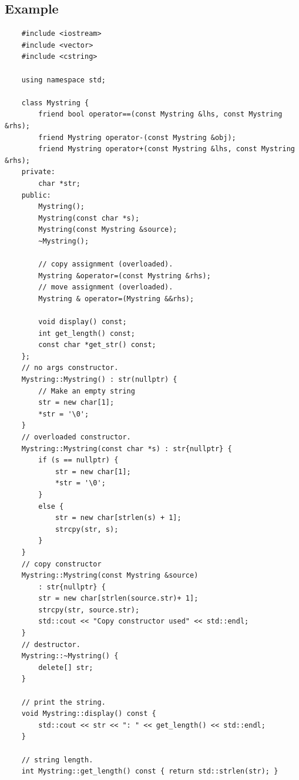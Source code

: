 \subsection{Example}
\begin{verbatim}
    #include <iostream>
    #include <vector>
    #include <cstring>

    using namespace std;

    class Mystring {
        friend bool operator==(const Mystring &lhs, const Mystring &rhs);
        friend Mystring operator-(const Mystring &obj);
        friend Mystring operator+(const Mystring &lhs, const Mystring &rhs);
    private:
        char *str;
    public:
        Mystring();
        Mystring(const char *s);
        Mystring(const Mystring &source);
        ~Mystring();

        // copy assignment (overloaded).
        Mystring &operator=(const Mystring &rhs);
        // move assignment (overloaded).
        Mystring & operator=(Mystring &&rhs);

        void display() const;
        int get_length() const;
        const char *get_str() const;
    };
    // no args constructor.
    Mystring::Mystring() : str(nullptr) {
        // Make an empty string
        str = new char[1];
        *str = '\0';
    }
    // overloaded constructor.
    Mystring::Mystring(const char *s) : str{nullptr} {
        if (s == nullptr) {
            str = new char[1];
            *str = '\0';
        }
        else {
            str = new char[strlen(s) + 1];
            strcpy(str, s);
        }
    }
    // copy constructor
    Mystring::Mystring(const Mystring &source) 
        : str{nullptr} {
        str = new char[strlen(source.str)+ 1];
        strcpy(str, source.str);
        std::cout << "Copy constructor used" << std::endl;
    }
    // destructor.
    Mystring::~Mystring() {
        delete[] str;
    }

    // print the string.
    void Mystring::display() const {
        std::cout << str << ": " << get_length() << std::endl;
    }

    // string length.
    int Mystring::get_length() const { return std::strlen(str); }


\end{verbatim}
